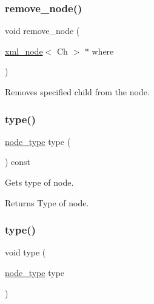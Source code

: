 \subsubsection{\texorpdfstring{remove\+\_\+node()}{remove\_node()}}
{\footnotesize\ttfamily void remove\+\_\+node (\begin{DoxyParamCaption}\item[{\mbox{\hyperlink{classrapidxml_1_1xml__node}{xml\+\_\+node}}$<$ Ch $>$ $\ast$}]{where }\end{DoxyParamCaption})\hspace{0.3cm}{\ttfamily [inline]}}



Removes specified child from the node. 

\mbox{\label{classrapidxml_1_1xml__node_a026a603e420a2e3e7ab820cfbd1a7e97}} 
\subsubsection{\texorpdfstring{type()}{type()}\hspace{0.1cm}{\footnotesize\ttfamily [1/2]}}
{\footnotesize\ttfamily \mbox{\hyperlink{namespacerapidxml_a6a276b85e2da28c5f9c3dbce61c55682}{node\+\_\+type}} type (\begin{DoxyParamCaption}{ }\end{DoxyParamCaption}) const\hspace{0.3cm}{\ttfamily [inline]}}



Gets type of node. 

\begin{DoxyReturn}{Returns}
Type of node. 
\end{DoxyReturn}
\mbox{\label{classrapidxml_1_1xml__node_aa78759bfa429fa2ab6bc5fe617cfa3cf}} 
\subsubsection{\texorpdfstring{type()}{type()}\hspace{0.1cm}{\footnotesize\ttfamily [2/2]}}
{\footnotesize\ttfamily void type (\begin{DoxyParamCaption}\item[{\mbox{\hyperlink{namespacerapidxml_a6a276b85e2da28c5f9c3dbce61c55682}{node\+\_\+type}}}]{type }\end{DoxyParamCaption})\hspace{0.3cm}{\ttfamily [inline]}}



